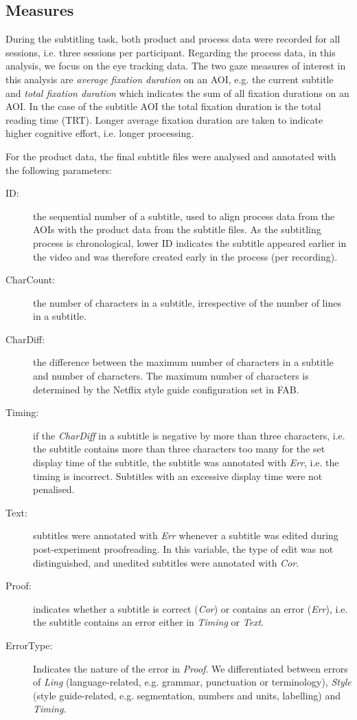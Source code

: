 \documentclass[output=paper]{langscibook}
\begin{document}
\subsection{Measures}
During the subtitling task, both product and process data were recorded for all sessions, i.e. three sessions per participant.
Regarding the process data, in this analysis, we focus on the eye tracking data.
The two gaze measures of interest in this analysis are \textit{average fixation duration} on an AOI, e.g.
the current subtitle and \textit{total fixation duration} which indicates the sum of all fixation durations on an AOI.
In the case of the subtitle AOI the total fixation duration is the total reading time (TRT).
Longer average fixation duration are taken to indicate higher cognitive effort, i.e. longer processing.

For the product data, the final subtitle files were analysed and annotated with the following parameters:

\begin{description}
\item[ID:] the sequential number of a subtitle, used to align process data from the AOIs with the product data from the subtitle files. As the subtitling process is chronological, lower ID indicates the subtitle appeared earlier in the video and was therefore created early in the process (per recording).
\item[CharCount:] the number of characters in a subtitle, irrespective of the number of lines in a subtitle.
\item[CharDiff:] the difference between the maximum number of characters in a subtitle and number of characters. The maximum number of characters is determined by the Netflix style guide configuration set in FAB.
\item[Timing:] if the \textit{CharDiff} in a subtitle is negative by more than three characters, i.e. the subtitle contains more than three characters too many for the set display time of the subtitle, the subtitle was annotated with \textit{Err}, i.e. the timing is incorrect. Subtitles with an excessive display time were not penalised.
\item[Text:] subtitles were annotated with \textit{Err} whenever a subtitle was edited during post-experiment proofreading. In this variable, the type of edit was not distinguished, and unedited subtitles were annotated with \textit{Cor}.
\item[Proof:] indicates whether a subtitle is correct (\textit{Cor}) or contains an error (\textit{Err}), i.e. the subtitle contains an error either in \textit{Timing} or \textit{Text}.
\item[ErrorType:] Indicates the nature of the error in \textit{Proof}.
We differentiated between errors of \textit{Ling} (language-related, e.g.
grammar, punctuation or terminology), \textit{Style} (style guide-related, e.g.
segmentation, numbers and units, labelling) and \textit{Timing}.
\end{description}
\end{document}

